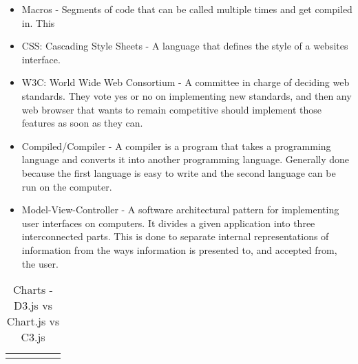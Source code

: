 \documentclass[draftclsnofoot,onecolumn,letterpaper,10pt,compsoc]{IEEEtran}
\begin{document}
  \begin{itemize}
    \item Macros - Segments of code that can be called multiple times and get compiled in. This
    \item CSS: Cascading Style Sheets - A language that defines the style of a websites interface.
    \item W3C: World Wide Web Consortium - A committee in charge of deciding web standards. They vote yes or no on implementing new standards, and then any web browser that wants to remain competitive should implement those features as soon as they can.
    \item Compiled/Compiler - A compiler is a program that takes a programming language and converts it into another programming language. Generally done because the first language is easy to write and the second language can be run on the computer.
    \item Model-View-Controller - A software architectural pattern for implementing user interfaces on computers. It divides a given application into three interconnected parts. This is done to separate internal representations of information from the ways information is presented to, and accepted from, the user.
  \end{itemize}

\begin{landscape}
  \begin{table}[]
  \centering
  \caption{Charts - D3.js vs Chart.js vs C3.js}
  \label{my-label}
    \begin{tabular}{lllll}
      &  &  &  & \\
    \end{tabular}
  \end{table}
\end{landscape}

\clearpage

{}

\end{document}
